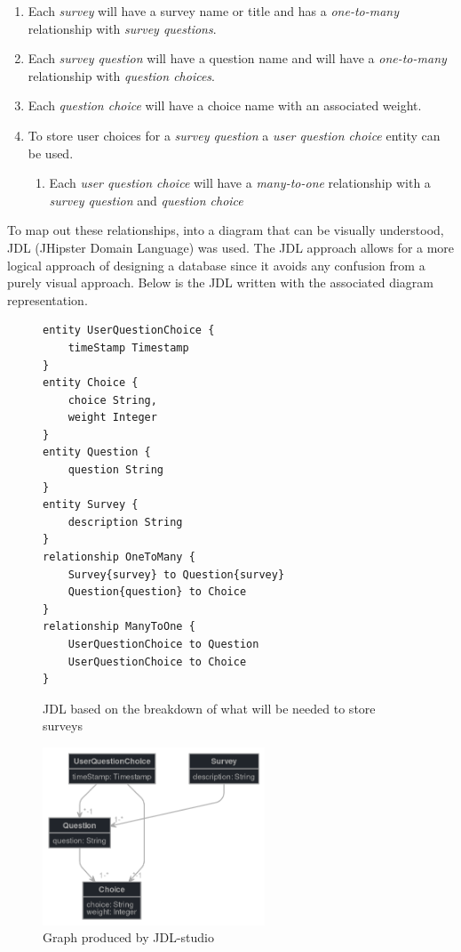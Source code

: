 \begin{enumerate}
    \item Each \textit{survey} will have a survey name or title and has a \textit{one-to-many} relationship with \textit{survey questions}.
    \item Each \textit{survey question} will have a question name and will have a \textit{one-to-many} relationship with \textit{question choices}.
    \item Each \textit{question choice} will have a choice name with an associated weight.
    \item To store user choices for a \textit{survey question} a \textit{user question choice} entity can be used.
        \begin{enumerate}
            \item Each \textit{user question choice} will have a \textit{many-to-one} relationship with a \textit{survey question} and \textit{question choice}
        \end{enumerate}
\end{enumerate}

To map out these relationships, into a diagram that can be visually understood, JDL (JHipster Domain Language) was used.
The JDL approach allows for a more logical approach of designing a database since it avoids any confusion from a purely visual approach.
Below is the JDL written with the associated diagram representation.

\begin{figure}[ht]
    \centering
    \begin{lstlisting}[language=JDL]
entity UserQuestionChoice {
    timeStamp Timestamp
}
entity Choice {
    choice String,
    weight Integer
}
entity Question {
    question String
}
entity Survey {
    description String
}
relationship OneToMany {
    Survey{survey} to Question{survey}
    Question{question} to Choice
}
relationship ManyToOne {
    UserQuestionChoice to Question
    UserQuestionChoice to Choice
}
    \end{lstlisting}
    \caption{JDL based on the breakdown of what will be needed to store surveys}
\end{figure}

\clearpage
\begin{figure}[ht]
    \centering
    \includegraphics[width=250px]{images/jhipster-jdl.png}
    \caption{Graph produced by JDL-studio}
    \label{survey-jdl-graph}
\end{figure}

